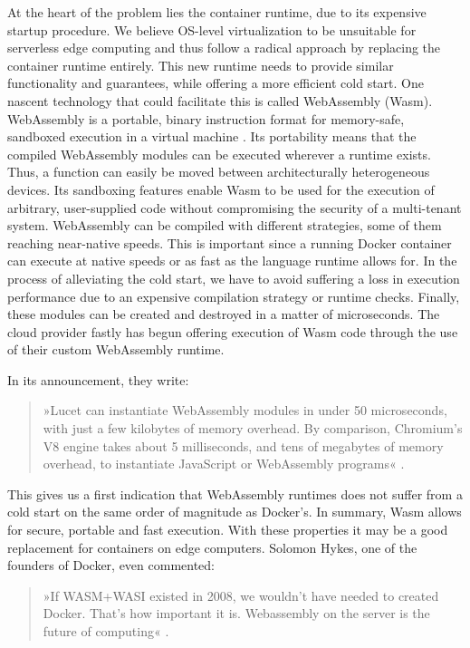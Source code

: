 At the heart of the problem lies the container runtime, due to its expensive startup procedure. We believe OS-level virtualization to be unsuitable for serverless edge computing and thus follow a radical approach by replacing the container runtime entirely. This new runtime needs to provide similar functionality and guarantees, while offering a more efficient cold start. One nascent technology that could facilitate this is called WebAssembly (Wasm).
WebAssembly is a portable, binary instruction format for memory-safe, sandboxed execution in a virtual machine \cite{W3C2020}. Its portability means that the compiled WebAssembly modules can be executed wherever a runtime exists.
Thus, a function can easily be moved between architecturally heterogeneous devices. Its sandboxing features enable Wasm to be used for the execution of arbitrary, user-supplied code without compromising the security of a multi-tenant system. WebAssembly can be compiled with different strategies, some of them reaching near-native speeds. This is important since a running Docker container can execute at native speeds or as fast as the language runtime allows for. In the process of alleviating the cold start, we have to avoid suffering a loss in execution performance due to an expensive compilation strategy or runtime checks. Finally, these modules can be created and destroyed in a matter of microseconds. The cloud provider fastly has begun offering execution of Wasm code through the use of their custom  WebAssembly runtime.

In its announcement, they write:

\begin{quote}
  »Lucet can instantiate WebAssembly modules in under 50 microseconds, with just a few kilobytes of memory overhead. By comparison, Chromium’s V8 engine takes about 5 milliseconds, and tens of megabytes of memory overhead, to instantiate JavaScript or WebAssembly programs« \cite{fastly2019}.
\end{quote}

This gives us a first indication that WebAssembly runtimes does not suffer from a cold start on the same order of magnitude as Docker's.
In summary, Wasm allows for secure, portable and fast execution. With these properties it may be a good replacement for containers on edge computers. Solomon Hykes, one of the founders of Docker, even commented:

\begin{quote}
  »If WASM+WASI existed in 2008, we wouldn't have needed to created Docker. That's how important it is. Webassembly on the server is the future of computing« \cite{Hykes2019}.
\end{quote}

